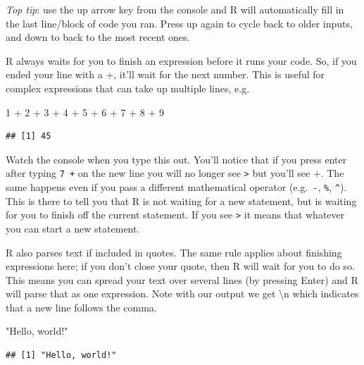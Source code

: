 \documentclass[
]{book}
\newenvironment{Shaded}{\begin{snugshade}}{\end{snugshade}}
\newcommand{\DecValTok}[1]{\textcolor[rgb]{0.00,0.00,0.81}{#1}}
\newcommand{\SpecialCharTok}[1]{\textcolor[rgb]{0.00,0.00,0.00}{#1}}
\newcommand{\StringTok}[1]{\textcolor[rgb]{0.31,0.60,0.02}{#1}}
\begin{document}
\emph{Top tip}: use the up arrow key from the console and R will automatically fill in the last line/block of code you ran. Press up again to cycle back to older inputs, and down to back to the most recent ones.

R always waits for you to finish an expression before it runs your code. So, if you ended your line with a +, it'll wait for the next number. This is useful for complex expressions that can take up multiple lines, e.g.

\begin{Shaded}
\begin{Highlighting}[]
\DecValTok{1} \SpecialCharTok{+} \DecValTok{2} \SpecialCharTok{+} \DecValTok{3} \SpecialCharTok{+} \DecValTok{4} \SpecialCharTok{+} \DecValTok{5} \SpecialCharTok{+} \DecValTok{6} \SpecialCharTok{+} \DecValTok{7} \SpecialCharTok{+}
  \DecValTok{8} \SpecialCharTok{+} \DecValTok{9}
\end{Highlighting}
\end{Shaded}

\begin{verbatim}
## [1] 45
\end{verbatim}

Watch the console when you type this out. You'll notice that if you press enter after typing \texttt{7\ +} on the new line you will no longer see \texttt{\textgreater{}} but you'll see +. The same happens even if you pass a different mathematical operator (e.g.~\texttt{-}, \texttt{\%}, \texttt{\^{}}). This is there to tell you that R is not waiting for a new statement, but is waiting for you to finish off the current statement. If you see \texttt{\textgreater{}} it means that whatever you can start a new statement.

R also parses text if included in quotes. The same rule applies about finishing expressions here; if you don't close your quote, then R will wait for you to do so. This means you can spread your text over several lines (by pressing Enter) and R will parse that as one expression. Note with our output we get \textbackslash n which indicates that a new line follows the comma.

\begin{Shaded}
\begin{Highlighting}[]
\StringTok{"Hello, world!"}
\end{Highlighting}
\end{Shaded}

\begin{verbatim}
## [1] "Hello, world!"
\end{verbatim}
\end{document}

